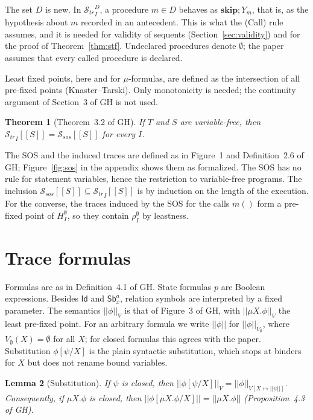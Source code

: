 \documentclass[11pt]{article}
\newcommand{\sem}[1]{[\![ #1 ]\!]}
\newcommand{\fsem}[1]{|\!|#1|\!|}
\newcommand{\Str}{{\mathcal{S}_{\mathit{tr}}}}
\newcommand{\Ssos}{{\mathcal{S}_{\mathit{sos}}}}
\newcommand{\Id}{\mathsf{Id}}
\newcommand{\Sb}[2]{\mathsf{Sb}^{#1}_{#2}}
\newcommand{\kw}[1]{\mathbf{#1}}
\newcommand{\skipS}{\kw{skip}}
\newcommand{\call}[1]{#1()}
\newcommand{\GH}[1]{#1 of GH}
\theoremstyle{plain}
\newtheorem{theorem}{Theorem}[section]
\newtheorem{lemma}[theorem]{Lemma}
\theoremstyle{definition}
\theoremstyle{remark}
\begin{document}
The set $D$ is new. In $\Str^D_I$, a procedure $m \in D$ behaves as
$\skipS; Y_m$, that is, as the hypothesis about $m$ recorded in an
antecedent. This is what the (Call) rule assumes, and it is needed for
validity of sequents (Section~\ref{sec:validity}) and for the proof of
Theorem~\ref{thm:stf}. Undeclared procedures denote $\emptyset$; the paper
assumes that every called procedure is declared.

Least fixed points, here and for $\mu$-formulas, are defined as the
intersection of all pre-fixed points (Knaster--Tarski). Only monotonicity is
needed; the continuity argument of \GH{Section~3} is not used.

\begin{theorem}[\GH{Theorem~3.2}]\label{thm:sos}
  If $T$ and $S$ are variable-free, then $\Str_I\sem{S} = \Ssos\sem{S}$ for
  every $I$.
\end{theorem}

The SOS and the induced traces are defined as in \GH{Figure~1 and
Definition~2.6}; Figure~\ref{fig:sos} in the appendix shows them as
formalized. The SOS has no rule for statement variables, hence the
restriction to variable-free programs. The inclusion
$\Ssos\sem{S} \subseteq \Str_I\sem{S}$ is by induction on the length of the
execution. For the converse, the traces induced by the SOS for the calls
$\call{m}$ form a pre-fixed point of $H^{\emptyset}_I$, so they contain
$\rho^{\emptyset}_I$ by leastness.

\section{Trace formulas}

Formulas are as in \GH{Definition~4.1}. State formulas $p$ are Boolean
expressions. Besides $\Id$ and $\Sb{a}{x}$, relation symbols are interpreted
by a fixed parameter. The semantics $\fsem{\phi}_V$ is that of \GH{Figure~3}, with
$\fsem{\mu X.\phi}_V$ the least pre-fixed point. For an
arbitrary formula we write $\fsem{\phi}$ for $\fsem{\phi}_{V_\emptyset}$,
where $V_\emptyset(X) = \emptyset$ for all $X$; for closed formulas this
agrees with the paper. Substitution $\phi[\psi/X]$ is the plain syntactic
substitution, which stops at binders for $X$ but does not rename bound
variables.

\begin{lemma}[Substitution]\label{lem:subst}
  If $\psi$ is closed, then
  $\fsem{\phi[\psi/X]}_V = \fsem{\phi}_{V[X \mapsto \fsem{\psi}]}$.
  Consequently, if $\mu X.\phi$ is closed, then
  $\fsem{\phi[\mu X.\phi/X]} = \fsem{\mu X.\phi}$ (\GH{Proposition~4.3}).
\end{lemma}
\end{document}
